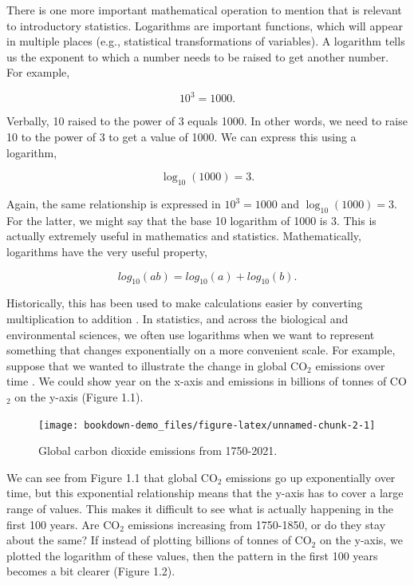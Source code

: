 \documentclass[
]{scrbook}
\begin{document}
There is one more important mathematical operation to mention that is relevant to introductory statistics.
Logarithms are important functions, which will appear in multiple places (e.g., statistical transformations of variables).
A logarithm tells us the exponent to which a number needs to be raised to get another number.
For example,

\[10^{3} = 1000.\]

Verbally, 10 raised to the power of 3 equals 1000.
In other words, we need to raise 10 to the power of 3 to get a value of 1000.
We can express this using a logarithm,

\[\log_{10}\left(1000\right) = 3.\]

Again, the same relationship is expressed in \(10^{3} = 1000\) and \(\log_{10}(1000) = 3\).
For the latter, we might say that the base 10 logarithm of 1000 is 3.
This is actually extremely useful in mathematics and statistics.
Mathematically, logarithms have the very useful property,

\[log_{10}(ab) = log_{10}(a) + log_{10}(b).\]

Historically, this has been used to make calculations easier by converting multiplication to addition \citep{Stewart2008}.
In statistics, and across the biological and environmental sciences, we often use logarithms when we want to represent something that changes exponentially on a more convenient scale.
For example, suppose that we wanted to illustrate the change in global CO\(_{2}\) emissions over time \citep{Friedlingstein2022}.
We could show year on the x-axis and emissions in billions of tonnes of CO\(_{2}\) on the y-axis (Figure 1.1).

\begin{figure}
\texttt{[image: bookdown-demo\_files/figure-latex/unnamed-chunk-2-1]} \caption{Global carbon dioxide emissions from 1750-2021.}\label{fig:unnamed-chunk-2}
\end{figure}

We can see from Figure 1.1 that global CO\(_{2}\) emissions go up exponentially over time, but this exponential relationship means that the y-axis has to cover a large range of values.
This makes it difficult to see what is actually happening in the first 100 years.
Are CO\(_{2}\) emissions increasing from 1750-1850, or do they stay about the same?
If instead of plotting billions of tonnes of CO\(_{2}\) on the y-axis, we plotted the logarithm of these values, then the pattern in the first 100 years becomes a bit clearer (Figure 1.2).
\end{document}
